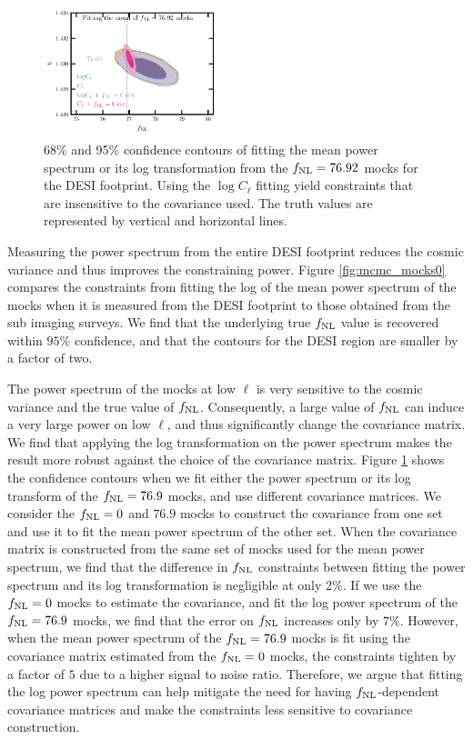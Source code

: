 \begin{figure}
    \centering
    \includegraphics[width=0.45\textwidth]{figures/mcmc_po100.pdf} 
    \caption{68\% and 95\% confidence contours of fitting the mean power spectrum or its log transformation from the $f_{\rm NL}=76.92$ mocks for the DESI footprint. Using the $\log C_{\ell}$ fitting yield constraints that are insensitive to the covariance used. The truth values are represented by vertical and horizontal lines.}\label{fig:mcmc_mocks100}
\end{figure}

Measuring the power spectrum from the entire DESI footprint reduces the cosmic variance and thus improves the constraining power. Figure \ref{fig:mcmc_mocks0} compares the constraints from fitting the log of the mean power spectrum of the mocks when it is measured from the DESI footprint to those obtained from the sub imaging surveys. We find that the underlying true $f_{\rm NL}$ value is recovered within $95\%$ confidence, and that the contours for the DESI region are smaller by a factor of two. 

The power spectrum of the mocks at low $\ell$ is very sensitive to the cosmic variance and the true value of $f_{\rm NL}$. Consequently, a large value of $f_{\rm NL}$ can induce a very large power on low $\ell$, and thus significantly change the covariance matrix. We find that applying the log transformation on the power spectrum makes the result more robust against the choice of the covariance matrix. Figure \ref{fig:mcmc_mocks100} shows the confidence contours when we fit either the power spectrum or its log transform of the $f_{\rm NL}=76.9$ mocks, and use different covariance matrices. We consider the $f_{\rm NL}=0$ and $76.9$ mocks to construct the covariance from one set and use it to fit the mean power spectrum of the other set. When the covariance matrix is constructed from the same set of mocks used for the mean power spectrum, we find that the difference in $f_{\rm NL}$ constraints between fitting the power spectrum and its log transformation is negligible at only 2\%. If we use the $f_{\rm NL}=0$ mocks to estimate the covariance, and fit the log power spectrum of the $f_{\rm NL}=76.9$ mocks, we find that the error on $f_{\rm NL}$ increases only by $7\%$. However, when the mean power spectrum of the $f_{\rm NL}=76.9$ mocks is fit using the covariance matrix estimated from the $f_{\rm NL}=0$ mocks, the constraints tighten by a factor of $5$ due to a higher signal to noise ratio. Therefore, we argue that fitting the log power spectrum can help mitigate the need for having $f_{\rm NL}$-dependent covariance matrices and make the constraints less sensitive to covariance construction.


